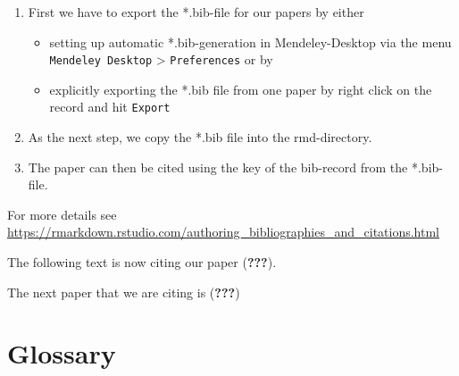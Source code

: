\documentclass[]{article}
\providecommand{\tightlist}{%
  \setlength{\itemsep}{0pt}\setlength{\parskip}{0pt}}
\begin{document}
\begin{enumerate}
\def\labelenumi{\arabic{enumi}.}
\tightlist
\item
  First we have to export the *.bib-file for our papers by either

  \begin{itemize}
  \tightlist
  \item
    setting up automatic *.bib-generation in Mendeley-Desktop via the
    menu \texttt{Mendeley\ Desktop} \textgreater{} \texttt{Preferences}
    or by
  \item
    explicitly exporting the *.bib file from one paper by right click on
    the record and hit \texttt{Export}
  \end{itemize}
\item
  As the next step, we copy the *.bib file into the rmd-directory.
\item
  The paper can then be cited using the key of the bib-record from the
  *.bib-file.
\end{enumerate}

For more details see
\url{https://rmarkdown.rstudio.com/authoring_bibliographies_and_citations.html}

The following text is now citing our paper ({\textbf{???}}).

The next paper that we are citing is ({\textbf{???}})

\section{Glossary}\label{glossary}
\end{document}
